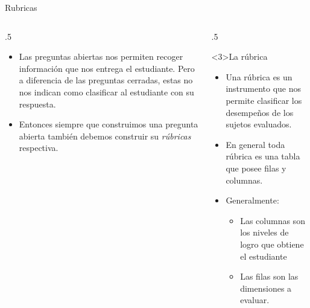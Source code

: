 \documentclass[11pt, aspectratio=169, xcolor=table,hyphens]{beamer}
\begin{document}
\begin{frame}{Rubricas}
	\begin{columns}
		\begin{column}{.5\linewidth}
			\begin{itemize}[<+->]
				\item Las preguntas abiertas nos permiten recoger información que nos entrega el estudiante. Pero a diferencia de las preguntas cerradas, estas no nos indican como clasificar al estudiante con su respuesta.
				\item Entonces siempre que construimos una pregunta abierta también debemos construir su \textit{rúbricas} respectiva.
			\end{itemize}
		\end{column}
		\begin{column}{.5\linewidth}
			\begin{block}<3>{La rúbrica}
				\begin{itemize}
					\item Una rúbrica es un instrumento que nos permite clasificar los desempeños de los sujetos evaluados.
					\item En general toda rúbrica es una tabla que posee filas y columnas.
					\item Generalmente:
					      \begin{itemize}
						      \item Las columnas son los niveles de logro que obtiene el estudiante
						      \item Las filas son las dimensiones a evaluar.
					      \end{itemize}
				\end{itemize}
			\end{block}
		\end{column}
	\end{columns}
\end{frame}
\end{document}
